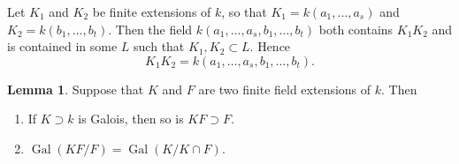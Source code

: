 \documentclass[10pt,letterpaper,cm]{nupset}
\theoremstyle{definition}
\theoremstyle{theorem}
\newtheorem{lemma}[definition]{Lemma}
\theoremstyle{remark}
\newcommand{\1}{\mathbf{1}}
\newcommand{\0}{\vec 0}
\DeclareMathOperator{\gal}{Gal}
\begin{document}
\smallskip

Let $K_1$ and $K_2$ be finite extensions of $k$, so that $K_1 = k(a_1, \ldots, a_s)$ and $K_2= k(b_1, \ldots, b_t)$. Then the field $k(a_1, \ldots, a_s, b_1, \ldots, b_t)$ both contains  $K_1K_2$ and is contained in some $L$ such that $K_1, K_2 \subset L$. Hence $$K_1K_2 =  k(a_1, \ldots, a_s, b_1, \ldots, b_t).$$ 


\begin{lemma}
Suppose that $K$ and $F$ are two finite field extensions of $k$. Then
\begin{enumerate}[label=(\alph*)]
\item If $K\supset k$ is Galois, then so is $KF\supset F$.
\item $\gal(KF/F) = \gal(K/ K \cap F)$.
\end{enumerate}
\end{lemma}
\end{document}
